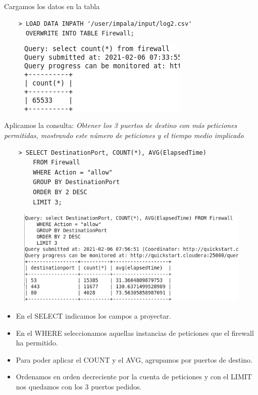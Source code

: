 \documentclass[13pt,a4paper]{article}
\begin{document}
\newpage

Cargamos los datos en la tabla
\begin{lstlisting}
    > LOAD DATA INPATH '/user/impala/input/log2.csv' 
      OVERWRITE INTO TABLE Firewall;
\end{lstlisting}

\begin{figure}[H]\center\includegraphics[width=.65\linewidth]{img/2.png}\end{figure}

Aplicamos la consulta: \textit{Obtener los 3 puertos de destino con más peticiones permitidas, mostrando este número de peticiones y el tiempo medio implicado}
\begin{lstlisting}
    > SELECT DestinationPort, COUNT(*), AVG(ElapsedTime) 
        FROM Firewall
        WHERE Action = "allow"
        GROUP BY DestinationPort
        ORDER BY 2 DESC
        LIMIT 3;
\end{lstlisting}

\begin{figure}[H]\center\includegraphics[width=.95\linewidth]{img/3.png}\end{figure}

\begin{itemize}
    \item En el SELECT indicamos los campos a proyectar.
    \item En el WHERE seleccionamos aquellas instancias de peticiones que el firewall ha permitido.
    \item Para poder aplicar el COUNT y el AVG, agrupamos por puertos de destino.
    \item Ordenamos en orden decreciente por la cuenta de peticiones y con el LIMIT nos quedamos con los 3 puertos pedidos.
\end{itemize}

    \setlength{\parskip}{1em}
    
    
    \newpage
\end{document}
